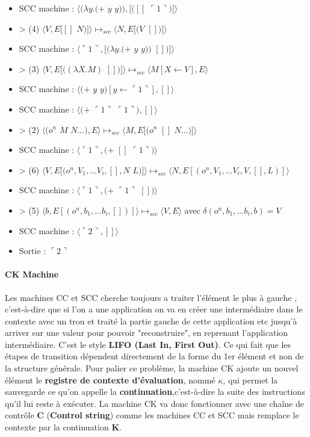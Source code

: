 \documentclass[10pt,a4paper]{article}
\begin{document}
\begin{itemize}
					\item[] SCC machine : $\langle(\lambda y.(+$ $y$ $y)),[([]$ $\ulcorner 1\urcorner)]\rangle$
					\item[] > (4) $\langle V,E[[]$ $N)]\rangle \longmapsto_{scc} \langle N,E[(V$ $[])]\rangle$
					\item[] SCC machine : $\langle\ulcorner 1\urcorner,[(\lambda y.(+$ $y$ $y))$ $[])]\rangle$
					\item[] > (3) $\langle V,E[((\lambda X.M)$ $[])]\rangle \longmapsto_{scc} \langle M[X\leftarrow V],E\rangle$
					\item[] SCC machine : $\langle(+$ $y$ $y)[y \leftarrow \ulcorner 1\urcorner],[]\rangle$	
					\item[] SCC machine : $\langle(+$ $\ulcorner 1\urcorner$ $\ulcorner 1\urcorner),[]\rangle$	
					\item[] > (2) $\langle(o^{n}$ $M$ $N...),E\rangle \longmapsto_{scc} \langle M,E[(o^{n}$ $[]$ $N...)]\rangle$
					\item[] SCC machine : $\langle\ulcorner 1\urcorner,(+$ $[]$ $\ulcorner 1\urcorner)\rangle$	
					\item[] > (6) $\langle V,E[(o^{n},V_{1},...V_{i},[],N$ $L)]\rangle \longmapsto_{scc} \langle N,E[(o^{n},V_{1},...V_{i},V,[],L)]\rangle$
					\item[] SCC machine : $\langle\ulcorner 1\urcorner,(+$ $\ulcorner 1\urcorner$ $[])\rangle$	
					\item[] > (5) $\langle b,E[(o^{n},b_{1},...b_{i},[])]\rangle \longmapsto_{scc} \langle V,E\rangle$ avec $\delta (o^{n},b_{1},...b_{i},b)=V$ 
					\item[] SCC machine : $\langle\ulcorner 2\urcorner,[]\rangle$	
					\item[] \smallbreak
					Sortie : $\ulcorner 2\urcorner$
				\end{itemize}
				\newpage
			
			
			
			\paragraph{CK Machine}
			
				Les machines CC et SCC cherche toujours a traiter l'élément le plus à gauche , c'est-à-dire que si l'on a une application on va en créer une intermédiaire dans le contexte avec un trou et traité la partie gauche de cette application etc jusqu'à arriver sur une valeur pour pouvoir "reconstruire", en reprenant l'application intermédiaire. C'est le style \textbf{ LIFO (Last In, First Out)}. Ce qui fait que les étapes de transition dépendent directement de la forme du 1er élément et non de la structure générale.
				\smallbreak
				Pour palier ce problème, la machine CK ajoute un nouvel élément le \textbf{registre de contexte d'évaluation}, nommé $\kappa$, qui permet la sauvegarde ce qu'on appelle la \textbf{continuation},c'est-à-dire la suite des instructions qu'il lui reste à exécuter.
				\smallbreak
				La machine CK va donc fonctionner avec une chaîne de contrôle \textbf{C} (\textbf{Control string}) comme les machines CC et SCC mais remplace le contexte par la continuation \textbf{K}. 
				\medbreak
				
\end{document}
